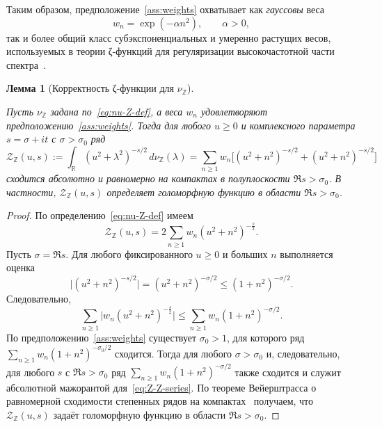 \documentclass{article}
\numberwithin{equation}{section}
\theoremstyle{plain}
\newtheorem{lemma}{Лемма}
\theoremstyle{definition}
\theoremstyle{remark}
\def\alpha{α}\def\beta{β}\def\gamma{γ}\def\Gamma{Γ}%
\begin{document}
\noindent
Таким образом, предположение~\ref{ass:weights} охватывает как
\emph{гауссовы} веса
\begin{equation}
\label{eq:weights-gauss}
w_n = \exp(-\alpha n^2),\qquad \alpha>0,
\end{equation}
так и более общий класс субэкспоненциальных и умеренно растущих весов,
используемых в теории ζ-функций для регуляризации высокочастотной части
спектра~\cite{Elizalde1995,Kirsten2001}.

\begin{lemma}[Корректность ζ-функции для \(\nu_{\mathbb Z}\)]
\label{lem:nu-Z-zeta-well-defined}
\label{lem:technical}

Пусть \(\nu_{\mathbb Z}\) задана по~\eqref{eq:nu-Z-def}, а веса \(w_n\)
удовлетворяют предположению~\ref{ass:weights}. Тогда для любого \(u\ge 0\) и
комплексного параметра \(s=\sigma+it\) с \(\sigma>\sigma_0\) ряд
\begin{equation}
\label{eq:Z-Z-zeta-def}
\mathcal Z_{\mathbb Z}(u,s)
:=
\int_{\mathbb R} (u^2+\lambda^2)^{-s/2}\,d\nu_{\mathbb Z}(\lambda)
=
\sum_{n\ge 1} w_n\big[(u^2+n^2)^{-s/2} + (u^2+n^2)^{-s/2}\big]
\end{equation}
сходится абсолютно и равномерно на компактах в полуплоскости
\(\Re s>\sigma_0\). В частности, \(\mathcal Z_{\mathbb Z}(u,s)\) определяет
голоморфную функцию в области \(\Re s>\sigma_0\).
\end{lemma}

\begin{proof}
По определению~\eqref{eq:nu-Z-def} имеем
\begin{equation}
\label{eq:Z-Z-series}
\mathcal Z_{\mathbb Z}(u,s)
=
2\sum_{n\ge 1} w_n (u^2+n^2)^{-\frac{s}{2}}.
\end{equation}
Пусть \(\sigma=\Re s\). Для любого фиксированного \(u\ge 0\) и больших \(n\)
выполняется оценка
\begin{equation}
\label{eq:Z-Z-asymptotics}
\big|(u^2+n^2)^{-s/2}\big|
=
(u^2+n^2)^{-\sigma/2}
\le
(1+n^2)^{-\sigma/2}.
\end{equation}
Следовательно,
\begin{equation}
\label{eq:Z-Z-majorant}
\sum_{n\ge 1} \Big|w_n (u^2+n^2)^{-\frac{s}{2}}\Big|
\le
\sum_{n\ge 1} w_n (1+n^2)^{-\sigma/2}.
\end{equation}
По предположению~\ref{ass:weights} существует \(\sigma_0>1\), для которого
ряд
\(\sum_{n\ge 1} w_n (1+n^2)^{-\sigma_0/2}\) сходится. Тогда для любого
\(\sigma>\sigma_0\) и, следовательно, для любого \(s\) с \(\Re s>\sigma_0\)
ряд \(\sum_{n\ge 1} w_n (1+n^2)^{-\sigma/2}\) также сходится и служит
абсолютной мажорантой для~\eqref{eq:Z-Z-series}. По теореме Вейерштрасса
о равномерной сходимости степенных рядов на компактах~\cite{Rudin1962}
получаем, что \(\mathcal Z_{\mathbb Z}(u,s)\) задаёт голоморфную функцию
в области \(\Re s>\sigma_0\).
\end{proof}
\end{document}
